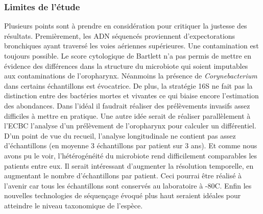 \documentclass[12pt,a4paper]{article}
\begin{document}
{\subsubsection{Limites de l'étude}
Plusieurs points sont à prendre en considération pour critiquer la justesse des résultats. Premièrement, les ADN séquencés proviennent d'expectorations bronchiques ayant traversé les voies aériennes supérieures. Une contamination est toujours possible. Le score cytologique de Bartlett n'a pas permis de mettre en évidence des différences dans la structure du microbiote qui soient imputables aux contaminations de l'oropharynx. Néanmoins la présence de \textit{Corynebacterium} dans certains échantillons est évocatrice. 
De plus, la stratégie 16S ne fait pas la distinction entre des bactéries mortes et vivantes ce qui biaise encore l'estimation des abondances. 
Dans l'idéal il faudrait réaliser des prélèvements invasifs assez difficiles à mettre en pratique. Une autre idée serait de réaliser parallèlement à l'ECBC l'analyse d'un prélèvement de l'oropharynx pour calculer un différentiel. \\
D'un point de vue du recueil, l'analyse longitudinale ne contient pas assez d'échantillons (en moyenne 3 échantillons par patient sur 3 ans). Et comme nous avons pu le voir, l'hétérogénéité du microbiote rend difficilement comparables les patients entre eux. Il serait intéressant d'augmenter la résolution temporelle, en augmentant le nombre d'échantillons par patient. Ceci pourrai être réalisé à l'avenir car tous les échantillons sont conservés au laboratoire à -80\degre C. 
Enfin les nouvelles technologies de séquençage évoqué plus haut seraient idéales pour atteindre le niveau taxonomique de l'espèce. 


}
\end{document}
